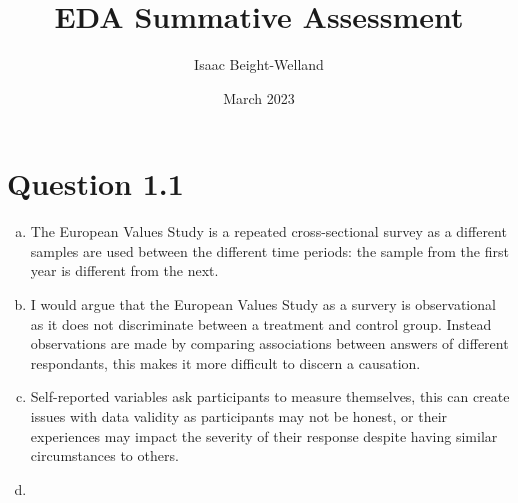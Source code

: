 \documentclass[11pt,a4paper]{article}
\title{EDA Summative Assessment}
\author{Isaac Beight-Welland}
\date{March 2023}
\newcommand{\itemspace}{\vspace{1em}\item}
\begin{document}
\maketitle



\section*{Question 1.1}



\begin{enumerate}[a)] 

  \itemspace 
    
     \par

    The European Values Study is a repeated cross-sectional survey as a
    different samples are used between the different time periods: the sample
    from the first year is different from the next. 
    
  \itemspace 

     \par

    I would argue that the European Values Study as a survery is observational
    as it does not discriminate between a treatment and control group. Instead
    observations are made by comparing associations between answers of
    different respondants, this makes it more difficult to discern a causation. \par

  \itemspace 

     \par

    Self-reported variables ask participants to measure themselves, this can
    create issues with data validity as participants may not be honest, or
    their experiences may impact the severity of their response despite having
    similar circumstances to others. \par
    
  \itemspace 

     \par 


\end{enumerate}
\end{document}
